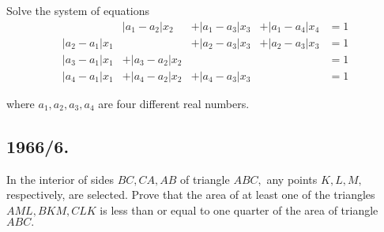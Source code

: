 \documentclass[12pt,thmsa]{article}
\begin{document}
Solve the system of equations
\[
\begin{array}{lllll}
& \left| a_{1}-a_{2}\right| x_{2} & +\left| a_{1}-a_{3}\right| x_{3} & 
+\left| a_{1}-a_{4}\right| x_{4} & =1 \\ 
\left| a_{2}-a_{1}\right| x_{1} &  & +\left| a_{2}-a_{3}\right| x_{3} & 
+\left| a_{2}-a_{3}\right| x_{3} & =1 \\ 
\left| a_{3}-a_{1}\right| x_{1} & +\left| a_{3}-a_{2}\right| x_{2} &  &  & =1
\\ 
\left| a_{4}-a_{1}\right| x_{1} & +\left| a_{4}-a_{2}\right| x_{2} & +\left|
a_{4}-a_{3}\right| x_{3} &  & =1
\end{array}
\]

where $a_{1},a_{2},a_{3},a_{4}$ are four different real numbers.

\subsection{1966/6.}

In the interior of sides $BC,CA,AB$ of triangle $ABC,$ any points $K,L,M,$
respectively, are selected. Prove that the area of at least one of the
triangles $AML,BKM,CLK$ is less than or equal to one quarter of the area of
triangle $ABC.$
\end{document}
